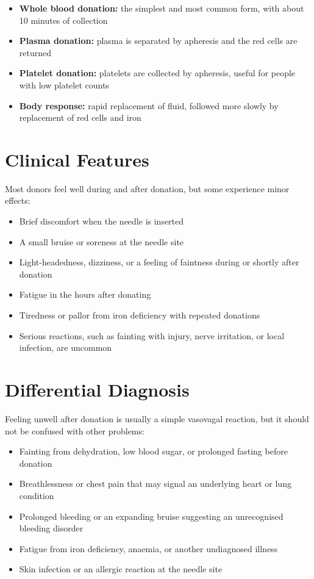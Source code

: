 \begin{itemize}
    \item \textbf{Whole blood donation:} the simplest and most common form, with about 10 minutes of collection
    \item \textbf{Plasma donation:} plasma is separated by apheresis and the red cells are returned
    \item \textbf{Platelet donation:} platelets are collected by apheresis, useful for people with low platelet counts
    \item \textbf{Body response:} rapid replacement of fluid, followed more slowly by replacement of red cells and iron
\end{itemize}

\section*{Clinical Features}
Most donors feel well during and after donation, but some experience minor effects:

\begin{itemize}
    \item Brief discomfort when the needle is inserted
    \item A small bruise or soreness at the needle site
    \item Light-headedness, dizziness, or a feeling of faintness during or shortly after donation
    \item Fatigue in the hours after donating
    \item Tiredness or pallor from iron deficiency with repeated donations
    \item Serious reactions, such as fainting with injury, nerve irritation, or local infection, are uncommon
\end{itemize}

\section*{Differential Diagnosis}
Feeling unwell after donation is usually a simple vasovagal reaction, but it should not be confused with other problems:

\begin{itemize}
    \item Fainting from dehydration, low blood sugar, or prolonged fasting before donation
    \item Breathlessness or chest pain that may signal an underlying heart or lung condition
    \item Prolonged bleeding or an expanding bruise suggesting an unrecognised bleeding disorder
    \item Fatigue from iron deficiency, anaemia, or another undiagnosed illness
    \item Skin infection or an allergic reaction at the needle site
\end{itemize}

